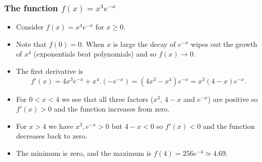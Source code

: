 \documentclass[9pt]{beamer}
\begin{document}
\begin{frame}[t]
 \frametitle{The function $f(x)=x^4 e^{-x}$}
 
 \begin{itemize}
  \item<1-> Consider $f(x)=x^4e^{-x}$ for $x\geq 0$.
  \item<2-> Note that $f(0)=0$.  When $x$ is large the decay of
   $e^{-x}$ wipes out the growth of $x^4$ (exponentials beat
   polynomials) and so $f(x)\to 0$.
  \item<3-> The first derivative is 
   \[ f'(x) = 4x^3e^{-x} + x^4.(-e^{-x}) 
       = (4x^3-x^4)e^{-x} = x^3(4-x)e^{-x}.
   \]
  \item<4-> For $0<x<4$ we see that all three factors ($x^3$, $4-x$
   and $e^{-x}$) are positive so $f'(x)>0$ and the function increases
   from zero.
  \item<5-> For $x>4$ we have $x^3,e^{-x}>0$ but $4-x<0$ so $f'(x)<0$
   and the function decreases back to zero.
  \item<6-> The minimum is zero, and the maximum is
   $f(4)=256e^{-4}\simeq 4.69$.
 \end{itemize}
\end{frame}
\end{document}
